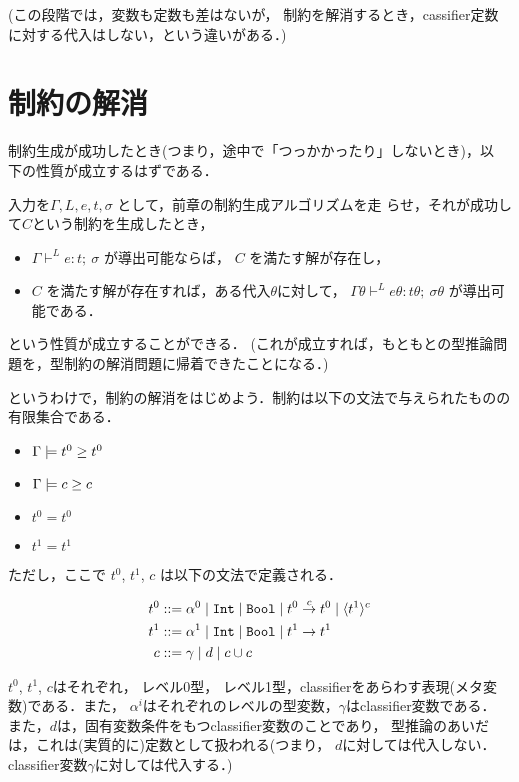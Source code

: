 \documentclass[dvipdfmx]{jsarticle}
\newcommand\longer[2]{{#1} \ord {#2}}
\newcommand\Int{\mbox{\texttt{Int}}}
\newcommand\Bool{\mbox{\texttt{Bool}}}
\newcommand\uni{\cup} %
\begin{document}
(この段階では，変数も定数も差はないが，
制約を解消するとき，cassifier定数に対する代入はしない，という違いがある．)

\section{制約の解消}

制約生成が成功したとき(つまり，途中で「つっかかったり」しないとき)，以
下の性質が成立するはずである．

入力を$\Gamma, L, e, t,\sigma$ として，前章の制約生成アルゴリズムを走
らせ，それが成功して$C$という制約を生成したとき，
\begin{itemize}
\item
  $\Gamma \vdash^L e: t; ~ \sigma$ が導出可能ならば，
  $C$ を満たす解が存在し，
\item
  $C$ を満たす解が存在すれば，ある代入$\theta$に対して，
  $\Gamma\theta \vdash^L e\theta: t\theta; ~ \sigma\theta$ が導出可能である．
\end{itemize}
という性質が成立することができる．
(これが成立すれば，もともとの型推論問題を，型制約の解消問題に帰着できたことになる．)

というわけで，制約の解消をはじめよう．制約は以下の文法で与えられたものの有限集合である．

\begin{itemize}
\item $\Gamma \models \longer{t^0}{t^0}$
\item $\Gamma \models \longer{c}{c}$
\item $t^0=t^0$
\item $t^1=t^1$
\end{itemize}
ただし，ここで $t^0$, $t^1$, $c$ は以下の文法で定義される．

\begin{align*}
  t^0 & ::= \alpha^0 \mid \Int \mid \Bool \mid \funT{t^0}{t^0}{c} \mid \codeT{t^1}{c} \\
  t^1 & ::= \alpha^1 \mid \Int \mid \Bool \mid \funT{t^1}{t^1}{} \\
  c   & ::= \gamma \mid d \mid c \uni c
\end{align*}

$t^0$, $t^1$, $c$はそれぞれ，
レベル0型，
レベル1型，classifierをあらわす表現(メタ変数)である．また，
$\alpha^i$はそれぞれのレベルの型変数，$\gamma$はclassifier変数である．
また，$d$は，固有変数条件をもつclassifier変数のことであり，
型推論のあいだは，これは(実質的に)定数として扱われる(つまり，
$d$に対しては代入しない．classifier変数$\gamma$に対しては代入する．)
\end{document}
